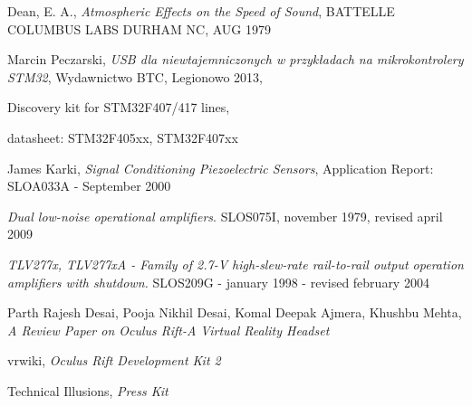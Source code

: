 \begin{thebibliography}{99}



  Dean, E. A., \textit{Atmospheric Effects on the Speed of Sound}, BATTELLE COLUMBUS LABS DURHAM NC, AUG 1979

 Marcin Peczarski, 
  \textit{USB dla niewtajemniczonych w przykładach na mikrokontrolery STM32}, Wydawnictwo BTC, Legionowo 2013,

 Discovery kit for STM32F407/417 lines,

   datasheet: STM32F405xx, STM32F407xx 
  
   James Karki, \textit{Signal Conditioning Piezoelectric Sensors}, 
  Application Report: SLOA033A - September 2000

   \textit{Dual low-noise operational amplifiers}. SLOS075I, november 1979, revised april 2009

   \textit{TLV277x, TLV277xA - Family of 2.7-V high-slew-rate rail-to-rail output operation amplifiers with shutdown.}
  SLOS209G - january 1998 - revised february 2004

  
    Parth Rajesh Desai, Pooja Nikhil Desai, Komal Deepak Ajmera, Khushbu Mehta,
  \textit{A Review Paper on Oculus Rift-A Virtual Reality Headset}

    vrwiki,
  \textit{Oculus Rift Development Kit 2}
  
   Technical Illusions,
  \textit{Press Kit}


\end{thebibliography}
